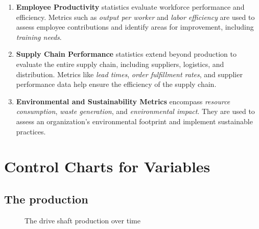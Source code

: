 \documentclass[
  a4paper,
]{scrbook}
\begin{document}
\begin{enumerate}
\item
  \textbf{Employee Productivity} statistics evaluate workforce
  performance and efficiency. Metrics such as \emph{output per worker}
  and \emph{labor efficiency} are used to assess employee contributions
  and identify areas for improvement, including \emph{training needs}.
\item
  \textbf{Supply Chain Performance} statistics extend beyond production
  to evaluate the entire supply chain, including suppliers, logistics,
  and distribution. Metrics like \emph{lead times}, \emph{order
  fulfillment rates}, and supplier performance data help ensure the
  efficiency of the supply chain.
\item
  \textbf{Environmental and Sustainability Metrics} encompass
  \emph{resource consumption}, \emph{waste generation}, and
  \emph{environmental impact}. They are used to assess an organization's
  environmental footprint and implement sustainable practices.
\end{enumerate}

\section{Control Charts for
Variables}\label{control-charts-for-variables}

\subsection{The production}\label{the-production}

\begin{figure}[ht]


\caption{\label{fig-production}The drive shaft production over time}

\end{figure}%
\end{document}

